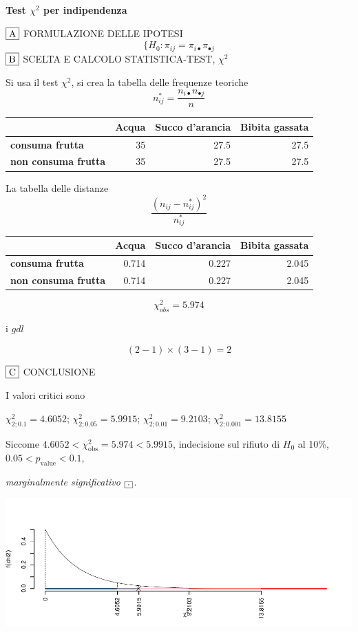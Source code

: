 \documentclass[
  11pt,
]{book}
\theoremstyle{mytheoremstyle}
\theoremstyle{mydefstyle}
\newenvironment{sol}
  {
  \begin{tcolorbox}[enhanced,breakable,arc=0.1mm,boxrule=1pt,colback=white,colframe=iblue,
  title=\bf \fontfamily{lmss}\selectfont \hspace{.5 cm} Soluzione,drop fuzzy shadow]

}{
\end{tcolorbox}
  }
\begin{document}
\begin{sol}
\textbf{Test \(\chi^2\) per indipendenza}

\(\fbox{A}\) FORMULAZIONE DELLE IPOTESI
\[
\Big\{H_0:\pi_{ij}=\pi_{i\bullet}\pi_{\bullet j}
\]
\(\fbox{B}\) SCELTA E CALCOLO STATISTICA-TEST, \(\chi^2\)

Si usa il test \(\chi^2\), si crea la tabella delle frequenze teoriche
\[
n_{ij}^*=\frac{n_{i\bullet}n_{\bullet j}}{n}
\]

\begin{table}[H]
\centering
\begin{tabular}{>{}lrrr}
\toprule
  & Acqua & Succo d'arancia & Bibita gassata\\
\midrule
\textbf{consuma frutta} & 35 & 27.5 & 27.5\\
\textbf{non consuma frutta} & 35 & 27.5 & 27.5\\
\bottomrule
\end{tabular}
\end{table}

La tabella delle distanze
\[
\frac{(n_{ij}-n_{ij}^*)^2}{n_{ij}^*}
\]

\begin{table}[H]
\centering
\begin{tabular}{>{}lrrr}
\toprule
  & Acqua & Succo d'arancia & Bibita gassata\\
\midrule
\textbf{consuma frutta} & 0.714 & 0.227 & 2.045\\
\textbf{non consuma frutta} & 0.714 & 0.227 & 2.045\\
\bottomrule
\end{tabular}
\end{table}

\[
    \chi^2_{obs}= 5.974 
  \]

i \(gdl\)

\[
    ( 2 -1)\times( 3 -1)= 2 
  \]

\(\fbox{C}\) CONCLUSIONE

I valori critici sono

\(\chi^2_{2;0.1}=4.6052\); \(\chi^2_{2;0.05}=5.9915\); \(\chi^2_{2;0.01}=9.2103\); \(\chi^2_{2;0.001}=13.8155\)

Siccome \(4.6052<\chi^2_\text{obs}=5.974<5.9915\), indecisione sul rifiuto di \(H_0\) al 10\%, \(0.05<p_\text{value}<0.1\),

\emph{marginalmente significativo} \(\fbox{.}\).

\begin{center}\includegraphics{Esami_passati_con_soluzioni_files/figure-latex/05a-chi2-4-1} \end{center}


\end{sol}
\end{document}
